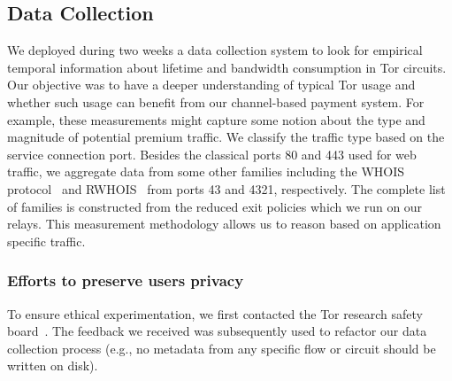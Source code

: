 
\subsection{Data Collection}
\label{subsec:datacollection}

We deployed during two weeks a data collection system to look for empirical temporal information
about lifetime and bandwidth consumption in Tor circuits. Our objective was to
have a deeper understanding of typical Tor usage and whether such usage can
benefit from our channel-based payment system. For example, these measurements
might capture some notion about the type and magnitude of potential premium
traffic. We classify the traffic type based on the service connection
port. Besides the classical ports 80 and 443 used for web traffic, we aggregate
data from some other families including the WHOIS
protocol~\cite{daigle2004whois} and RWHOIS~\cite{williamson1994referral} from
ports 43 and 4321, respectively. The complete list of families is constructed
from the reduced exit policies which we run on our relays. This measurement
methodology allows us to reason based on application specific traffic.


\subsubsection{Efforts to preserve users privacy}

To ensure ethical experimentation, we first contacted the Tor research safety
board~\cite{torsafety}. The feedback we received was subsequently used to refactor our data
collection process (e.g., no metadata from any specific flow or circuit should be written on disk).

